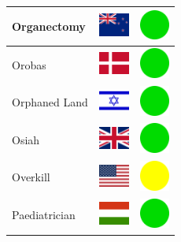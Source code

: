 \documentclass[12pt, a4paper, twoside]{report}
\begin{document}
\begin{center}
\begin{longtable}{|p{5cm}|p{2cm}|p{2cm}|}
 Organectomy                                                & \includegraphics[width=1cm]{../4x3/nz} &   \includegraphics[width=1cm]{../likes/y} \\ \hline
 Orobas                                                     & \includegraphics[width=1cm]{../4x3/dk} &   \includegraphics[width=1cm]{../likes/y} \\ \hline
 Orphaned Land                                              & \includegraphics[width=1cm]{../4x3/il} &   \includegraphics[width=1cm]{../likes/y} \\ \hline
 Osiah                                                      & \includegraphics[width=1cm]{../4x3/gb} &   \includegraphics[width=1cm]{../likes/y} \\ \hline
 Overkill                                                   & \includegraphics[width=1cm]{../4x3/us} &   \includegraphics[width=1cm]{../likes/m} \\ \hline
 Paediatrician                                              & \includegraphics[width=1cm]{../4x3/hu} &   \includegraphics[width=1cm]{../likes/y} \\ \hline

\end{longtable}
\end{center}
\end{document}
